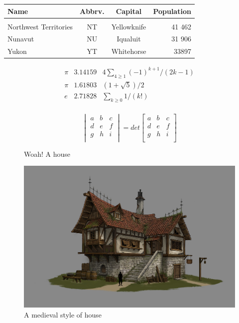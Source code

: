 \documentclass[12pt]{article}
\begin{document}
\begin{tabular}{lccr}
    \textbf{Name} & \textbf{Abbrv.} & \textbf{Capital} & \textbf{Population} \\
    \hline \\[1mm]
    Northwest Territories & NT & Yellowknife & 41 462 \\
    Nunavut & NU & Iqualuit & 31 906 \\
    Yukon & YT & Whitehorse & 33897 \\
\end{tabular}


$$
\begin{array}{lll}
    \pi & 3.14159 & 4\sum_{4\geq 1}(-1)^{k+1}/(2k-1) \\
    \pi & 1.61803 & (1 + \sqrt{5})/2 \\
    e & 2.71828 & \sum_{k\geq 0} 1/(k!) \\
\end{array}
$$


$$
 \begin{vmatrix}
    a & b & c \\
    d & e & f\\
    g & h & i\\
 \end{vmatrix}
 = det 
 \begin{bmatrix}
    a & b & c \\
    d & e & f\\
    g & h & i\\
 \end{bmatrix}
$$


\clearpage
\begin{figure}[b]
    \centering
    
    Woah! A house
    \begin{center}
        \includegraphics[scale = 1]{donghee-han-d2.jpg}
    \end{center}
    \caption{A medieval style of house}
    
\end{figure}
\end{document}
